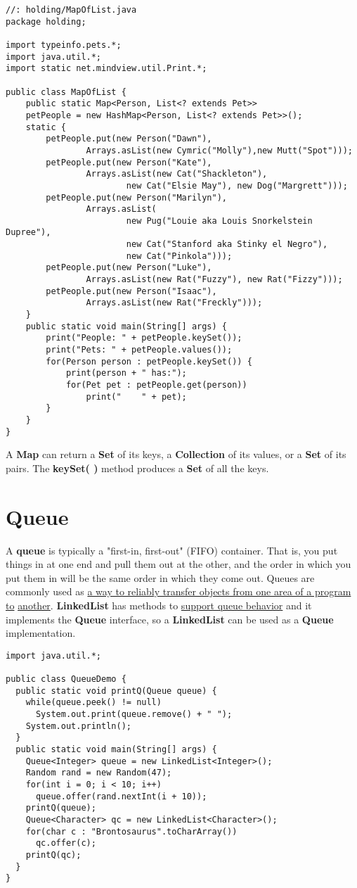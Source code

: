 \documentclass[10pt,letterpaper]{report}
\begin{document}
\begin{lstlisting}
//: holding/MapOfList.java
package holding;

import typeinfo.pets.*;
import java.util.*;
import static net.mindview.util.Print.*;

public class MapOfList {
	public static Map<Person, List<? extends Pet>>
	petPeople = new HashMap<Person, List<? extends Pet>>();
	static {
		petPeople.put(new Person("Dawn"),
				Arrays.asList(new Cymric("Molly"),new Mutt("Spot")));
		petPeople.put(new Person("Kate"),
				Arrays.asList(new Cat("Shackleton"),
						new Cat("Elsie May"), new Dog("Margrett")));
		petPeople.put(new Person("Marilyn"),
				Arrays.asList(
						new Pug("Louie aka Louis Snorkelstein Dupree"),
						new Cat("Stanford aka Stinky el Negro"),
						new Cat("Pinkola")));	
		petPeople.put(new Person("Luke"),
				Arrays.asList(new Rat("Fuzzy"), new Rat("Fizzy")));
		petPeople.put(new Person("Isaac"),
				Arrays.asList(new Rat("Freckly")));
	}
	public static void main(String[] args) {
		print("People: " + petPeople.keySet());
		print("Pets: " + petPeople.values());
		for(Person person : petPeople.keySet()) {
			print(person + " has:");
			for(Pet pet : petPeople.get(person))
				print("    " + pet);
		}
	}
}
\end{lstlisting}

A \textbf{Map} can return a \textbf{Set} of its keys, a \textbf{Collection} of its values, or a \textbf{Set} of its pairs. The \textbf{keySet( )} method produces a \textbf{Set} of all the keys.
\section{Queue}

A \textbf{queue} is typically a "first-in, first-out" (FIFO) container. That is, you put things in at one end and pull them out at the other, and the order in which you put them in will be the same order in which they come out. Queues are commonly used as \underline{a way to reliably transfer objects from one area of a program to} \underline{another}.
\textbf{LinkedList} has methods to \underline{support queue behavior} and it implements the \textbf{Queue} interface, so a \textbf{LinkedList} can be used as a \textbf{Queue} implementation.

\begin{lstlisting}
import java.util.*;

public class QueueDemo {
  public static void printQ(Queue queue) {
    while(queue.peek() != null)
      System.out.print(queue.remove() + " ");
    System.out.println();
  }
  public static void main(String[] args) {
    Queue<Integer> queue = new LinkedList<Integer>();
    Random rand = new Random(47);
    for(int i = 0; i < 10; i++)
      queue.offer(rand.nextInt(i + 10));
    printQ(queue);
    Queue<Character> qc = new LinkedList<Character>();
    for(char c : "Brontosaurus".toCharArray())
      qc.offer(c);
    printQ(qc);
  }
}
\end{lstlisting}
\end{document}
